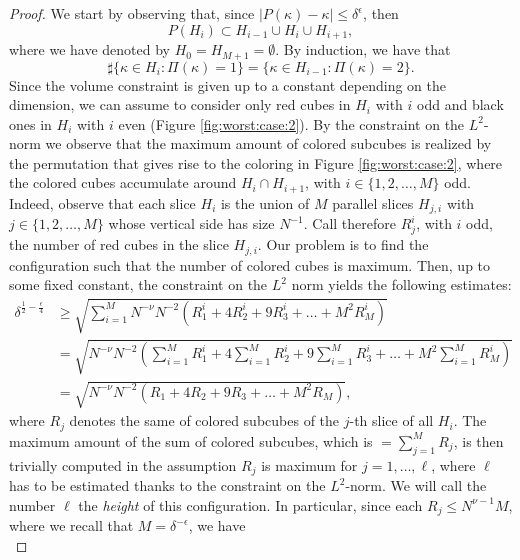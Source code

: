 \documentclass[12 pt]{article}
\theoremstyle{definition} \newtheorem{definition}{Definition}[section]
\theoremstyle{definition} \newtheorem{remark}[definition]{Remark}
\theoremstyle{plain} \newtheorem{lemma}[definition]{Lemma}
\theoremstyle{plain} \newtheorem{proposition}[definition]{Proposition}
\theoremstyle{plain} \newtheorem{theorem}[definition]{Theorem}
\theoremstyle{plain} \newtheorem{corollary}[definition]{Corollary}
\theoremstyle{definition} \newtheorem{example}[definition]{Example}
\theoremstyle{definition} \newtheorem{assumption}[definition]{Assumption}
\theoremstyle{definition} \newtheorem{conjecture}[definition]{Conjecture}
\newcommand{\1}{\mathbbm 1}
\numberwithin{equation}{section}
\begin{document}
\begin{proof}
    We start by observing that, since $|P(\kappa)-\kappa|\leq \delta^\epsilon$, then 
\begin{equation*}
    P(H_i)\subset H_{i-1}\cup H_{i}\cup H_{i+1},
\end{equation*}
where we have denoted by $H_0=H_{M+1}=\emptyset$.
By induction, we have that
\begin{equation}\label{eq:observation}
    \sharp \lbrace \kappa\in H_i: \Pi(\kappa)=1\rbrace=\lbrace \kappa\in H_{i-1}:\Pi(\kappa)=2\rbrace.
\end{equation}
Since the volume constraint is given up to a constant depending on the dimension, we can assume to consider only red cubes in $H_i$ with $i$ odd and black ones in $H_i$ with $i$ even (Figure \ref{fig:worst:case:2}).
By the constraint on the $L^2$-norm we observe that the maximum amount of colored subcubes is realized by the permutation that gives rise to the coloring in Figure \ref{fig:worst:case:2}, where the colored cubes accumulate around $H_i\cap H_{i+1}$, with $i\in\lbrace 1,2,\dots,M\rbrace$ odd. Indeed, observe that each slice $H_i$ is the union of $M$ parallel slices $H_{j,i}$ with $j\in\lbrace 1,2,\dots,M\rbrace$ whose vertical side has size $N^{-1}$. Call therefore $R_j^i$, with $i$ odd, the number of red cubes in the slice $H_{j,i}$. Our problem is to find the configuration such that the number of colored cubes is maximum. Then, up to some fixed constant, the constraint on the $L^2$ norm yields the following estimates:
\begin{align*}
    \delta^{\frac{1}{2}-\frac{\epsilon}{4}}&\geq \sqrt{\sum_{i=1}^M N^{-\nu}N^{-2}(R^i_1+4R^i_2+9R^i_3+\dots+M^2R^i_M)}\\&=
    \sqrt{ N^{-\nu}N^{-2}(\sum_{i=1}^M R^i_1+4\sum_{i=1}^MR^i_2+9\sum_{i=1}^MR^i_3+\dots+M^2\sum_{i=1}^MR^i_M)}\\&=
    \sqrt{ N^{-\nu}N^{-2}(R_1+4R_2+9R_3+\dots+M^2R_M)},
\end{align*}
where $R_j$ denotes the same of colored subcubes of the $j$-th slice of all $H_i$. 
The maximum amount of the sum of colored subcubes, which is $=\sum_{j=1}^M R_j$, is then trivially computed in the assumption $R_j$ is maximum for $j=1,\dots, \ell$, where $\ell$ has to be estimated thanks to the constraint on the $L^2$-norm. We will call the number $\ell$ the \emph{height} of this configuration. In particular, since each $R_j\leq N^{\nu-1}M$, where we recall that $M=\delta^{-\epsilon}$, 
we have
\begin{equation*}

\end{equation*}
\end{proof}
\end{document}
